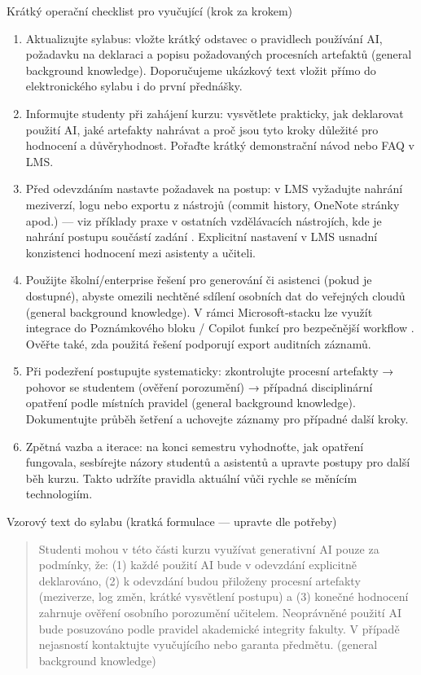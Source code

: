 Krátký operační checklist pro vyučující (krok za krokem)
\begin{enumerate}
  \item Aktualizujte sylabus: vložte krátký odstavec o pravidlech používání AI, požadavku na deklaraci a popisu požadovaných procesních artefaktů (general background knowledge). Doporučujeme ukázkový text vložit přímo do elektronického sylabu i do první přednášky.
  \item Informujte studenty při zahájení kurzu: vysvětlete prakticky, jak deklarovat použití AI, jaké artefakty nahrávat a proč jsou tyto kroky důležité pro hodnocení a důvěryhodnost. Pořaďte krátký demonstrační návod nebo FAQ v LMS.
  \item Před odevzdáním nastavte požadavek na postup: v LMS vyžadujte nahrání meziverzí, logu nebo exportu z nástrojů (commit history, OneNote stránky apod.) — viz příklady praxe v ostatních vzdělávacích nástrojích, kde je nahrání postupu součástí zadání \cite{kb_ai_101_tipu_pdf_04e4a115_page_8_1}. Explicitní nastavení v LMS usnadní konzistenci hodnocení mezi asistenty a učiteli.
  \item Použijte školní/enterprise řešení pro generování či asistenci (pokud je dostupné), abyste omezili nechtěné sdílení osobních dat do veřejných cloudů (general background knowledge). V rámci Microsoft‑stacku lze využít integrace do Poznámkového bloku / Copilot funkcí pro bezpečnější workflow \cite{kb_ai_101_tipu_pdf_04e4a115_page_14_1}. Ověřte také, zda použitá řešení podporují export auditních záznamů.
  \item Při podezření postupujte systematicky: zkontrolujte procesní artefakty → pohovor se studentem (ověření porozumění) → případná disciplinární opatření podle místních pravidel (general background knowledge). Dokumentujte průběh šetření a uchovejte záznamy pro případné další kroky.
  \item Zpětná vazba a iterace: na konci semestru vyhodnoťte, jak opatření fungovala, sesbírejte názory studentů a asistentů a upravte postupy pro další běh kurzu. Takto udržíte pravidla aktuální vůči rychle se měnícím technologiím.
\end{enumerate}

Vzorový text do sylabu (kratká formulace — upravte dle potřeby)
\begin{quote}
Studenti mohou v této části kurzu využívat generativní AI pouze za podmínky, že: (1) každé použití AI bude v odevzdání explicitně deklarováno, (2) k odevzdání budou přiloženy procesní artefakty (meziverze, log změn, krátké vysvětlení postupu) a (3) konečné hodnocení zahrnuje ověření osobního porozumění učitelem. Neoprávněné použití AI bude posuzováno podle pravidel akademické integrity fakulty. V případě nejasností kontaktujte vyučujícího nebo garanta předmětu. (general background knowledge)
\end{quote}

